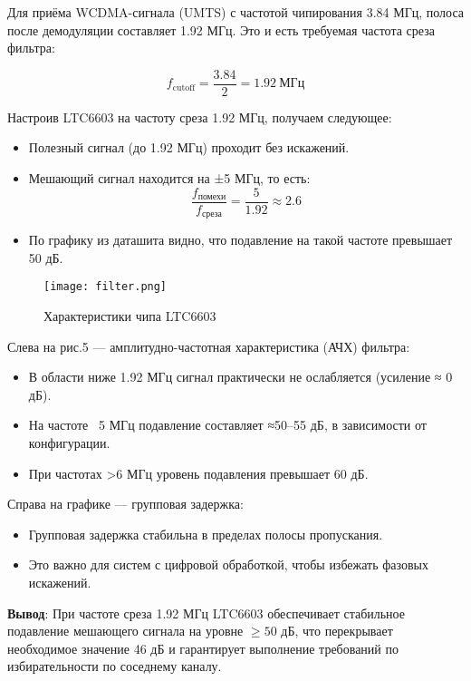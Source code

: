 \documentclass[a4paper,12pt]{article}
\begin{document}
Для приёма WCDMA-сигнала (UMTS) с частотой чипирования 3.84 МГц, полоса после демодуляции составляет 1.92 МГц. Это и есть требуемая частота среза фильтра:

\begin{equation}
f_{\text{cutoff}} = \frac{3.84}{2} = 1.92\ \text{МГц}
\end{equation}

Настроив LTC6603 на частоту среза 1.92 МГц, получаем следующее:
\begin{itemize}
    \item Полезный сигнал (до 1.92 МГц) проходит без искажений.
    \item Мешающий сигнал находится на ±5 МГц, то есть:
    \[
    \frac{f_{\text{помехи}}}{f_{\text{среза}}} = \frac{5}{1.92} \approx 2.6
    \]
    \item По графику из даташита видно, что подавление на такой частоте превышает 50 дБ.
\end{itemize}




\begin{figure}[H]
    \centering
    \texttt{[image: filter.png]}
    \caption{Характеристики чипа LTC6603}
    \label{fig:enter-label}
\end{figure}

Слева на рис.5 — амплитудно-частотная характеристика (АЧХ) фильтра:
\begin{itemize}
\item В области ниже 1.92 МГц сигнал практически не ослабляется (усиление ≈ 0 дБ).
\item На частоте ~5 МГц подавление составляет ≈50–55 дБ, в зависимости от конфигурации.
\item При частотах >6 МГц уровень подавления превышает 60 дБ.
\end{itemize}

Справа на графике — групповая задержка:
\begin{itemize}
\item Групповая задержка стабильна в пределах полосы пропускания.
\item Это важно для систем с цифровой обработкой, чтобы избежать фазовых искажений.
\end{itemize}

\textbf{Вывод}: При частоте среза 1.92 МГц LTC6603 обеспечивает стабильное подавление мешающего сигнала на уровне $\geq 50$ дБ, что перекрывает необходимое значение 46 дБ и гарантирует выполнение требований по избирательности по соседнему каналу.
\end{document}
